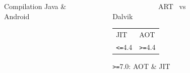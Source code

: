 \documentclass[aspectratio=1610]{beamer}%
\begin{document}
  \begin{frame}
    \slidetitle[Compilation]
    \pause
    \begin{columns}
      \begin{column}{0.5\linewidth}
        \begin{figure}
          \vspace{-0.5cm}
          
          \vspace{-0.25cm}
          \caption{Compilation Java \& Android}
        \end{figure}
      \end{column}
    \begin{column}{0.5\linewidth}
      \pause
      \begin{block}{
        ~~~~~~~~~~~~~ART \hfill ~vs \hfill Dalvik~~~~~~~~~~~~
      }
        \pause
        \begin{tabularx}{\textwidth}{YY}
        JIT & AOT \\
        \texttt{<=}4.4 & \texttt{>=}4.4
        \end{tabularx}
        \centering
        \pause
        \texttt{>=}7.0: AOT \& JIT
      \end{block}
    \end{column}
  \end{columns}
\end{frame}
\end{document}
